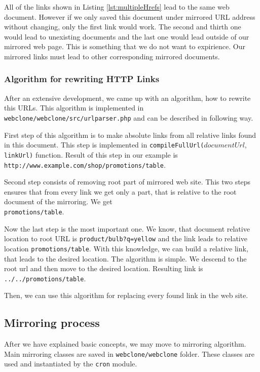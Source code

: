 All of the links shown in Listing \ref{lst:multipleHrefs} lead to the same web document. However if we only saved this document under mirrored URL address without changing, only the first link would work. The second and thirth one would lead to unexisting documents and the last one would lead outside of our mirrored web page. This is something that we do not want to expirience. Our mirrored links must lead to other corresponding mirrored documents.

\subsubsection{Algorithm for rewriting HTTP Links}
After an extensive development, we came up with an algorithm, how to rewrite this URLs. This algorithm is implemented in \texttt{webclone/webclone/src/urlparser.php} and can be described in following way.

First step of this algorithm is to make absolute links from all relative links found in this document. This step is implemented in \texttt{compileFullUrl($documentUrl, $linkUrl)} function. Result of this step in our example is \\ \texttt{http://www.example.com/shop/promotions/table}.

Second step consists of removing root part of mirrored web site. This two steps ensures that from every link we get only a part, that is relative to the root document of the mirroring. We get \\ \texttt{promotions/table}.

Now the last step is the most important one. We know, that document relative location to root URL is \texttt{product/bulb?q=yellow} and the link leads to relative location \texttt{promotions/table}. With this knowledge, we can build a relative link, that leads to the desired location. The algorithm is simple. We descend to the root url and then move to the desired location. Resulting link is \texttt{../../promotions/table}. 

Then, we can use this algorithm for replacing every found link in the web site.

\subsection{Mirroring process}
After we have explained basic concepts, we may move to mirroring algorithm. Main mirroring classes are saved in \texttt{webclone/webclone} folder. These classes are used and instantiated by the \texttt{cron} module.

